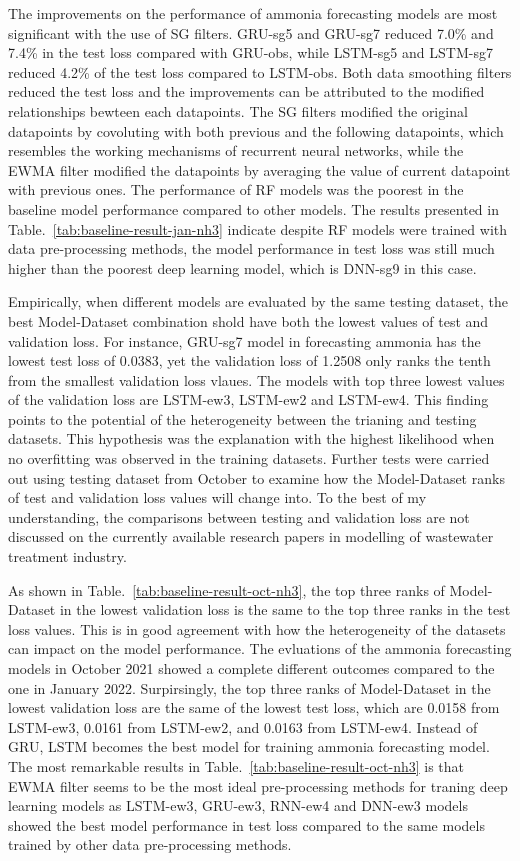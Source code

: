 The improvements on the performance of ammonia forecasting models are most significant with the use of SG filters. GRU-sg5 and GRU-sg7 reduced 7.0\% and 7.4\% in the test loss compared with GRU-obs, while LSTM-sg5 and LSTM-sg7 reduced 4.2\% of the test loss compared to LSTM-obs. Both data smoothing filters reduced the test loss and the improvements can be attributed to the modified relationships bewteen each datapoints. The SG filters modified the original datapoints by covoluting with both previous and the following datapoints, which resembles the working mechanisms of recurrent neural networks, while the EWMA filter modified the datapoints by averaging the value of current datapoint with previous ones. The performance of RF models was the poorest in the baseline model performance compared to other models. The results presented in Table.~\ref{tab:baseline-result-jan-nh3} indicate despite RF models were trained with data pre-processing methods, the model performance in test loss was still much higher than the poorest deep learning model, which is DNN-sg9 in this case.

Empirically, when different models are evaluated by the same testing dataset, the best Model-Dataset combination shold have both the lowest values of test and validation loss. For instance, GRU-sg7 model in forecasting ammonia has the lowest test loss of 0.0383, yet the validation loss of 1.2508 only ranks the tenth from the smallest validation loss vlaues. The models with top three lowest values of the validation loss are LSTM-ew3, LSTM-ew2 and LSTM-ew4. This finding points to the potential of the heterogeneity between the trianing and testing datasets. This hypothesis was the explanation with the highest likelihood when no overfitting was observed in the training datasets. Further tests were carried out using testing dataset from October to examine how the Model-Dataset ranks of test and validation loss values will change into. To the best of my understanding, the comparisons between testing and validation loss are not discussed on the currently available research papers in modelling of wastewater treatment industry.

As shown in Table.~\ref{tab:baseline-result-oct-nh3}, the top three ranks of Model-Dataset in the lowest validation loss is the same to the top three ranks in the test loss values. This is in good agreement with how the heterogeneity of the datasets can impact on the model performance. The evluations of the ammonia forecasting models in October 2021 showed a complete different outcomes compared to the one in January 2022. Surpirsingly, the top three ranks of Model-Dataset in the lowest validation loss are the same of the lowest test loss, which are 0.0158 from LSTM-ew3, 0.0161 from LSTM-ew2, and 0.0163 from LSTM-ew4. Instead of GRU, LSTM becomes the best model for training ammonia forecasting model. The most remarkable results in Table.~\ref{tab:baseline-result-oct-nh3} is that EWMA filter seems to be the most ideal pre-processing methods for traning deep learning models as LSTM-ew3, GRU-ew3, RNN-ew4 and DNN-ew3 models showed the best model performance in test loss compared to the same models trained by other data pre-processing methods.

